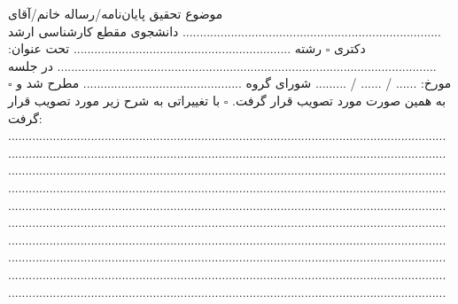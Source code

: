 \documentclass[letterpaper,11pt]{article}
\begin{document}
\begin{enumerate}
موضوع تحقیق پایان‌نامه/رساله خانم/آقای ........................................................................... \newline
دانشجوی مقطع کارشناسی ارشد \checkedsquare دکتری $\square$ رشته ............................................................... \newline
تحت عنوان: .............................................................................................................. \newline
در جلسه مورخ: ...... / ...... / ......... شورای گروه .............................................. مطرح شد و \newline
$\square$ به همین صورت مورد تصویب قرار گرفت. \newline
$\square$ با تغییراتی به شرح زیر مورد تصویب قرار گرفت: \newline
............................................................................................................................... \newline
............................................................................................................................... \newline
............................................................................................................................... \newline
............................................................................................................................... \newline
............................................................................................................................... \newline
............................................................................................................................... \newline
............................................................................................................................... \newline
............................................................................................................................... \newline
............................................................................................................................... \newline
............................................................................................................................... \newline

\end{enumerate}
\end{document}
